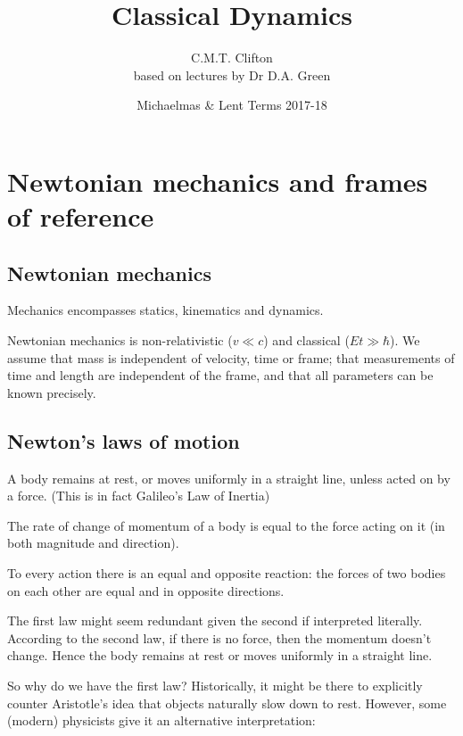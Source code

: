 \documentclass[a4paper]{article}
\title{Classical Dynamics}
\author{C.M.T. Clifton \\ \small based on lectures by Dr D.A. Green}
\date{Michaelmas \& Lent Terms 2017-18}
\begin{document}
\maketitle
\tableofcontents
\newpage

\section{Newtonian mechanics and frames of reference}
\subsection{Newtonian mechanics}
Mechanics encompasses statics, kinematics and dynamics.

Newtonian mechanics is non-relativistic ($v \ll c$) and classical ($E t \gg \hbar$). We assume that mass is independent of velocity, time or frame; that measurements of time and length are independent of the frame, and that all parameters can be known precisely.

\subsection{Newton's laws of motion}
\begin{law}
  A body remains at rest, or moves uniformly in a straight line, unless acted on by a force. (This is in fact Galileo's Law of Inertia)
\end{law} 

\begin{law}
   The rate of change of momentum of a body is equal to the force acting on it (in both magnitude and direction).
\end{law} 

\begin{law}
  To every action there is an equal and opposite reaction: the forces of two bodies on each other are equal and in opposite directions.
\end{law}

The first law might seem redundant given the second if interpreted literally. According to the second law, if there is no force, then the momentum doesn't change. Hence the body remains at rest or moves uniformly in a straight line.

So why do we have the first law? Historically, it might be there to explicitly counter Aristotle's idea that objects naturally slow down to rest. However, some (modern) physicists give it an alternative interpretation:
\end{document}
